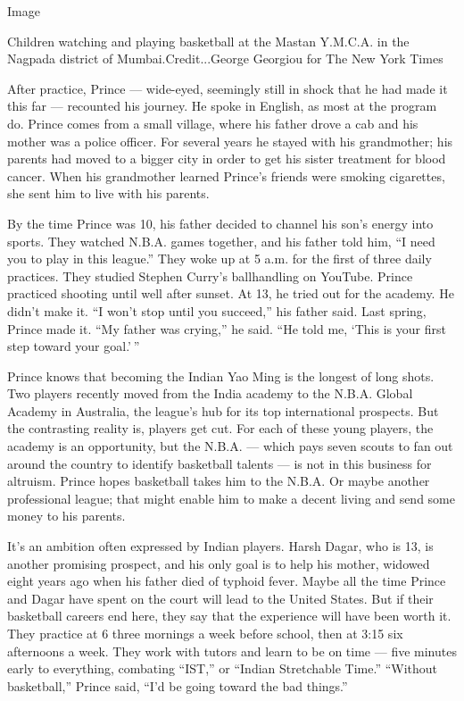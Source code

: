 Image

Children watching and playing basketball at the Mastan Y.M.C.A. in the
Nagpada district of Mumbai.Credit...George Georgiou for The New York
Times

After practice, Prince --- wide-eyed, seemingly still in shock that he
had made it this far --- recounted his journey. He spoke in English, as
most at the program do. Prince comes from a small village, where his
father drove a cab and his mother was a police officer. For several
years he stayed with his grandmother; his parents had moved to a bigger
city in order to get his sister treatment for blood cancer. When his
grandmother learned Prince's friends were smoking cigarettes, she sent
him to live with his parents.

By the time Prince was 10, his father decided to channel his son's
energy into sports. They watched N.B.A. games together, and his father
told him, ``I need you to play in this league.'' They woke up at 5 a.m.
for the first of three daily practices. They studied Stephen Curry's
ballhandling on YouTube. Prince practiced shooting until well after
sunset. At 13, he tried out for the academy. He didn't make it. ``I
won't stop until you succeed,'' his father said. Last spring, Prince
made it. ``My father was crying,'' he said. ``He told me, `This is your
first step toward your goal.' ''

Prince knows that becoming the Indian Yao Ming is the longest of long
shots. Two players recently moved from the India academy to the N.B.A.
Global Academy in Australia, the league's hub for its top international
prospects. But the contrasting reality is, players get cut. For each of
these young players, the academy is an opportunity, but the N.B.A. ---
which pays seven scouts to fan out around the country to identify
basketball talents --- is not in this business for altruism. Prince
hopes basketball takes him to the N.B.A. Or maybe another professional
league; that might enable him to make a decent living and send some
money to his parents.

It's an ambition often expressed by Indian players. Harsh Dagar, who is
13, is another promising prospect, and his only goal is to help his
mother, widowed eight years ago when his father died of typhoid fever.
Maybe all the time Prince and Dagar have spent on the court will lead to
the United States. But if their basketball careers end here, they say
that the experience will have been worth it. They practice at 6 three
mornings a week before school, then at 3:15 six afternoons a week. They
work with tutors and learn to be on time --- five minutes early to
everything, combating ``IST,'' or ``Indian Stretchable Time.'' ``Without
basketball,'' Prince said, ``I'd be going toward the bad things.''

